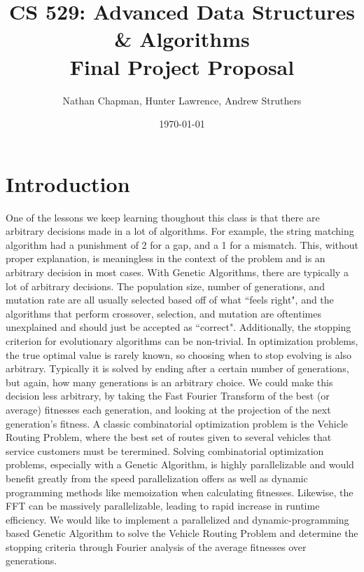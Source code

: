 \documentclass{article}
\title{\vspace*{-0.625in}CS 529: Advanced Data Structures \& Algorithms \\ Final Project Proposal}
\author{Nathan Chapman, Hunter Lawrence, Andrew Struthers}
\date{\today}
\renewcommand{\_}{\ifincsname_\else\legacyunderscore\fi}
\begin{document}
    \maketitle

\section*{Introduction}
One of the lessons we keep learning thoughout this class is that there are arbitrary decisions made in a lot of algorithms. For example, the string matching algorithm had a punishment of 2 for a gap, and a 1 for a mismatch. This, without proper explanation, is meaningless in the context of the problem and is an arbitrary decision in most cases. With Genetic Algorithms, there are typically a lot of arbitrary decisions. The population size, number of generations, and mutation rate are all usually selected based off of what ``feels right", and the algorithms that perform crossover, selection, and mutation are oftentimes unexplained and should just be accepted as ``correct". Additionally, the stopping criterion for evolutionary algorithms can be non-trivial. In optimization problems, the true optimal value is rarely known, so choosing when to stop evolving is also arbitrary. Typically it is solved by ending after a certain number of generations, but again, how many generations is an arbitrary choice. We could make this decision less arbitrary, by taking the Fast Fourier Transform of the best (or average) fitnesses each generation, and looking at the projection of the next generation's fitness. A classic combinatorial optimization problem is the Vehicle Routing Problem, where the best set of routes given to several vehicles that service customers must be terermined\cite{towardsdatascienceVehicleRouting}. Solving combinatorial optimization problems, especially with a Genetic Algorithm, is highly parallelizable and would benefit greatly from the speed parallelization offers as well as dynamic programming methods like memoization when calculating fitnesses. Likewise, the FFT can be massively parallelizable, leading to rapid increase in runtime efficiency. We would like to implement a parallelized and dynamic-programming based Genetic Algorithm to solve the Vehicle Routing Problem and determine the stopping criteria through Fourier analysis of the average fitnesses over generations. 
\end{document}
